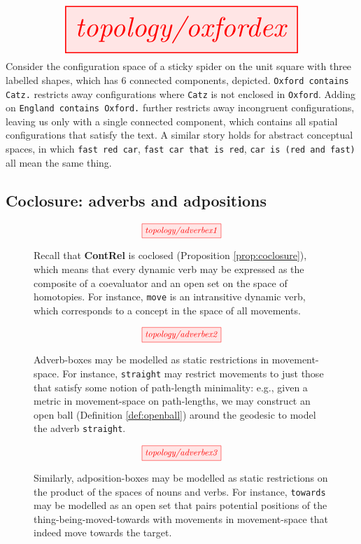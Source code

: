 \begin{example}
\[\resizebox{0.8\textwidth}{!}{\tikzfig{topology/oxfordex}}\]
Consider the configuration space of a sticky spider on the unit square with three labelled shapes, which has 6 connected components, depicted. \texttt{Oxford contains Catz.} restricts away configurations where \texttt{Catz} is not enclosed in \texttt{Oxford}. Adding on \texttt{England contains Oxford.} further restricts away incongruent configurations, leaving us only with a single connected component, which contains all spatial configurations that satisfy the text. A similar story holds for abstract conceptual spaces, in which \texttt{fast red car}, \texttt{fast car that is red}, \texttt{car is (red and fast)} all mean the same thing.
\end{example}


\subsection{Coclosure: adverbs and adpositions}

\begin{figure}[h!]
\[\scalebox{0.9}{\tikzfig{topology/adverbex1}}\]
\caption{
Recall that \textbf{ContRel} is coclosed (Proposition \ref{prop:coclosure}), which means that every dynamic verb may be expressed as the composite of a coevaluator and an open set on the space of homotopies. For instance, \texttt{move} is an intransitive dynamic verb, which corresponds to a concept in the space of all movements.
}
\end{figure}

\begin{figure}[h!]
\[\scalebox{0.9}{\tikzfig{topology/adverbex2}}\]
\caption{
Adverb-boxes may be modelled as static restrictions in movement-space. For instance, \texttt{straight} may restrict movements to just those that satisfy some notion of path-length minimality: e.g., given a metric in movement-space on path-lengths, we may construct an open ball (Definition \ref{def:openball}) around the geodesic to model the adverb \texttt{straight}.
}
\end{figure}

\begin{figure}[h!]
\[\scalebox{0.9}{\tikzfig{topology/adverbex3}}\]
\caption{
Similarly, adposition-boxes may be modelled as static restrictions on the product of the spaces of nouns and verbs. For instance, \texttt{towards} may be modelled as an open set that pairs potential positions of the thing-being-moved-towards with movements in movement-space that indeed move towards the target.
}
\end{figure}

